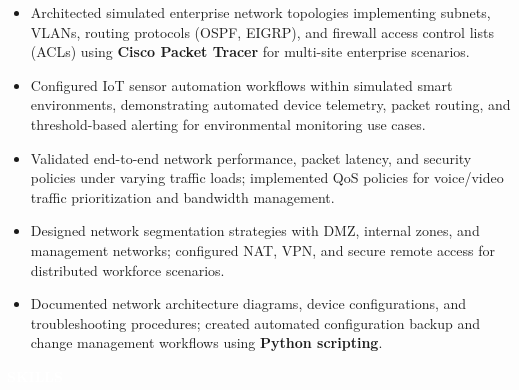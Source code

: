 \documentclass[10pt,a4paper]{article}
\newcommand{\resumesection}[1]{%
    \vspace{2pt}
    \noindent
    \colorbox{sectionblack}{%
        \parbox{\dimexpr\linewidth-2\fboxsep\relax}{%
            \centering
            \textcolor{white}{\textbf{\normalsize #1}}
        }%
    }%
    \vspace{1pt}
}
\begin{document}
\begin{itemize}

\item Architected simulated enterprise network topologies implementing subnets, VLANs, routing protocols (OSPF, EIGRP), and firewall access control lists (ACLs) using \textbf{Cisco Packet Tracer} for multi-site enterprise scenarios.

\item Configured IoT sensor automation workflows within simulated smart environments, demonstrating automated device telemetry, packet routing, and threshold-based alerting for environmental monitoring use cases.

\item Validated end-to-end network performance, packet latency, and security policies under varying traffic loads; implemented QoS policies for voice/video traffic prioritization and bandwidth management.

\item Designed network segmentation strategies with DMZ, internal zones, and management networks; configured NAT, VPN, and secure remote access for distributed workforce scenarios.

\item Documented network architecture diagrams, device configurations, and troubleshooting procedures; created automated configuration backup and change management workflows using \textbf{Python scripting}.

\end{itemize}


\resumesection{SKILLS}
\end{document}
